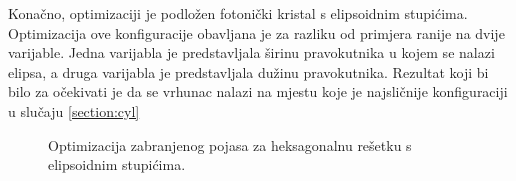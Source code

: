 \documentclass[utf8, seminar, numeric]{fer}
\begin{document}
Konačno, optimizaciji je podložen fotonički kristal s elipsoidnim stupićima.
Optimizacija ove konfiguracije obavljana je za razliku od primjera ranije na
dvije varijable. Jedna varijabla je predstavljala širinu pravokutnika u kojem se
nalazi elipsa, a druga varijabla je predstavljala dužinu pravokutnika.
Rezultat koji bi bilo za očekivati je da se vrhunac nalazi na mjestu koje je
najsličnije konfiguraciji u slučaju \ref{section:cyl}

\begin{figure}[ht]
\centering
    \qquad
	\caption{Optimizacija zabranjenog pojasa za heksagonalnu rešetku s
	elipsoidnim stupićima.}
	\label{fig:ellipsoid_optimization}
\end{figure}
\end{document}
